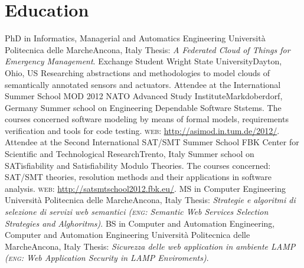 \section{Education}
%
  {PhD in Informatics, Managerial and Automatics Engineering}
  {Universit\`{a} Politecnica delle Marche}{Ancona, Italy}
  {}{
Thesis: \emph{A Federated Cloud of Things for Emergency Management}.
}
%
  {Exchange Student}
  {Wright State University}{Dayton, Ohio, US}
  {}{
Researching abstractions and methodologies to model clouds of semantically annotated sensors and
actuators.
}
%
  {Attendee at the International Summer School MOD 2012}
  {NATO Advanced Study Institute}{Markdoberdorf, Germany}
  {}{
Summer school on Engineering Dependable Software Ststems. The courses concerned software modeling by
means of formal models, requirements verification and tools for code testing. \textsc{web:}
\url{http://asimod.in.tum.de/2012/}.
}
%
  {Attendee at the Second International SAT/SMT Summer School}
  {FBK Center for Scientific and Technological Research}{Trento, Italy}
  {}{
Summer school on SATisfiability and Satisfiability Modulo Theories. The courses concerned: SAT/SMT
theories, resolution methods and their applications in software analysis. \textsc{web:}
\url{http://satsmtschool2012.fbk.eu/}.
}
%
  {MS in Computer Engineering}
  {Universit\`{a} Politecnica delle Marche}{Ancona, Italy}
  {}{
Thesis: \emph{Strategie e algoritmi di selezione di servizi web semantici (\textsc{eng:} Semantic
Web Services Selection Strategies and Alghoritms)}.
}
%
  {BS in Computer and Automation Engineering, Computer and Automation Engineering}
  {Universit\`{a} Politecnica delle Marche}{Ancona, Italy}
  {}{
Thesis: \emph{Sicurezza delle web application in ambiente LAMP (\textsc{eng:} Web Application
Security in LAMP Enviroments)}.
}
